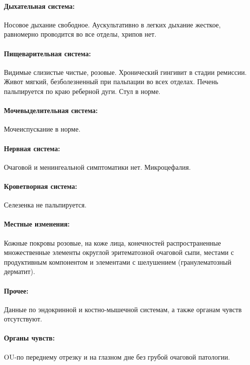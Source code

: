 \documentclass[a4paper,14pt]{extarticle}
\begin{document}
\paragraph{Дыхательная система:} Носовое дыхание свободное. Аускультативно в легких дыхание жесткое, равномерно проводится во все отделы, хрипов нет. 

\paragraph{Пищеварительная система:} Видимые слизистые чистые, розовые. Хронический гингивит в стадии ремиссии. Живот мягкий, безболезненный при пальпации во всех отделах. Печень пальпируется по краю реберной дуги. Стул в норме.

\paragraph{Мочевыделительная система:} Мочеиспускание в норме.

\paragraph{Нервная система:} Очаговой и менингеальной симптоматики нет. Микроцефалия.

\paragraph{Кроветворная система:} Селезенка не пальпируется.

\paragraph{Местные изменения:} Кожные покровы розовые, на коже лица, конечностей распространенные множественные элементы округлой эритематозной очаговой сыпи, местами с продуктивным компонентом и элементами с шелушением (гранулематозный дерматит).

\paragraph{Прочее:} Данные по эндокринной и костно-мышечной системам, а также органам чувств отсутствуют.

\paragraph{Органы чувств:} OU-по переднему отрезку и на глазном дне без грубой очаговой патологии.
\end{document}
